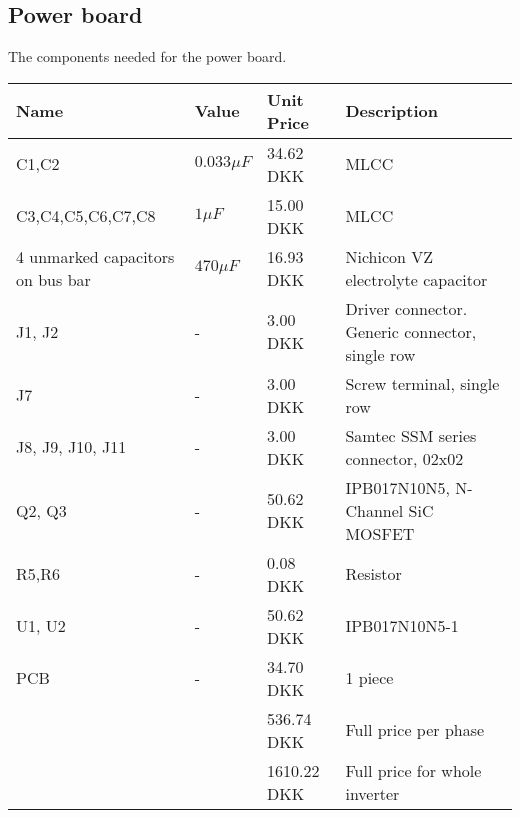 \subsection{Power board}
The components needed for the power board.
\begin{table}[H]
\centering
\footnotesize
\begin{tabular}{|p{4cm} p{1.5cm} p{2.2cm} p{6cm}|} \hline
\textbf{Name}    & \textbf{Value} & \textbf{Unit Price}
& \textbf{Description}                            \\ \hline
C1,C2             & $0.033\mu F$   & 34.62 DKK & MLCC                                            \\
C3,C4,C5,C6,C7,C8 & $1\mu F$       & 15.00 DKK & MLCC                                            \\
4 unmarked capacitors on bus bar   & $470 \mu F$ & 16.93 DKK & Nichicon VZ electrolyte capacitor        \\
J1, J2            &  -             & 3.00 DKK & Driver connector. Generic connector, single row \\
J7                & -              & 3.00 DKK  & Screw terminal, single row                      \\
J8, J9, J10, J11  & -              & 3.00 DKK & Samtec SSM series connector, 02x02            \\
Q2, Q3            & -              & 50.62 DKK & IPB017N10N5, N-Channel SiC MOSFET               \\
R5,R6             & -              & 0.08 DKK & Resistor                                        \\
U1, U2            & -              & 50.62 DKK & IPB017N10N5-1 \\ 
PCB               & -                  & 34.70 DKK  & 1 piece    \\\hline
&& 536.74 DKK & Full price per phase \\ \hline
&& 1610.22 DKK & Full price for whole inverter \\ \hline
\end{tabular}
\end{table}

\newpage
